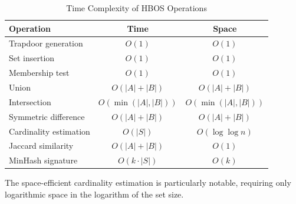 \documentclass[../main_comprehensive.tex]{subfiles}
\begin{document}
\begin{table}[h]
\centering
\caption{Time Complexity of HBOS Operations}
\begin{tabular}{lcc}
\toprule
Operation & Time & Space \\
\midrule
Trapdoor generation & $O(1)$ & $O(1)$ \\
Set insertion & $O(1)$ & $O(1)$ \\
Membership test & $O(1)$ & $O(1)$ \\
Union & $O(|A| + |B|)$ & $O(|A| + |B|)$ \\
Intersection & $O(\min(|A|, |B|))$ & $O(\min(|A|, |B|))$ \\
Symmetric difference & $O(|A| + |B|)$ & $O(|A| + |B|)$ \\
Cardinality estimation & $O(|S|)$ & $O(\log \log n)$ \\
Jaccard similarity & $O(|A| + |B|)$ & $O(1)$ \\
MinHash signature & $O(k \cdot |S|)$ & $O(k)$ \\
\bottomrule
\end{tabular}
\end{table}

The space-efficient cardinality estimation is particularly notable, requiring only logarithmic space in the logarithm of the set size.
\end{document}
